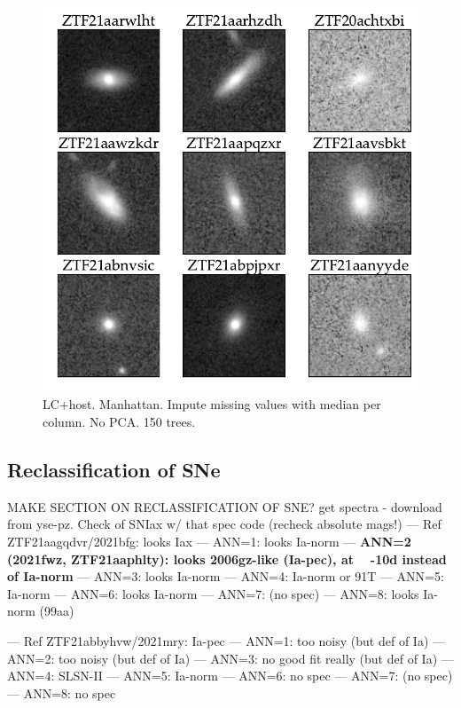 \documentclass[twocolumn]{aastex63}
\begin{document}
\begin{figure}
    \includegraphics[width=\columnwidth]{Figures/ZTF21aarwlht_host_thumbnails_manhattan.pdf}
    \caption{
    LC+host. Manhattan. Impute missing values with median per column. No PCA. 150 trees.
    } 
    \label{fig:lc+host}
\end{figure}


\subsection{Reclassification of SNe}  \label{subsec:reclass_sne}

MAKE SECTION ON RECLASSIFICATION OF SNE?
get spectra - download from yse-pz. Check of SNIax w/ that spec code (recheck absolute mags!)
	— Ref ZTF21aagqdvr/2021bfg: looks Iax 
	— ANN=1: looks Ia-norm	
	— \textbf{ANN=2 (2021fwz, ZTF21aaphlty): looks 2006gz-like (Ia-pec), at ~ -10d instead of Ia-norm}
	— ANN=3: looks Ia-norm
	— ANN=4: Ia-norm or 91T
	— ANN=5: Ia-norm
	— ANN=6: looks Ia-norm
	— ANN=7: (no spec)
	— ANN=8: looks Ia-norm (99aa)

	— Ref ZTF21abbyhvw/2021mry: Ia-pec
	— ANN=1: too noisy (but def of Ia)
	— ANN=2: too noisy (but def of Ia)
	— ANN=3: no good fit really (but def of Ia)
	— ANN=4: SLSN-II
	— ANN=5: Ia-norm
	— ANN=6: no spec
	— ANN=7: (no spec)
	— ANN=8: no spec
\end{document}
